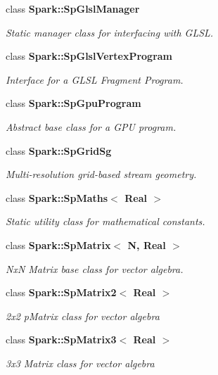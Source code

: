 \begin{CompactItemize}
class {\bf Spark::Sp\-Glsl\-Manager}
\begin{CompactList}\small\item\em Static manager class for interfacing with GLSL. \item\end{CompactList}\item 
class {\bf Spark::Sp\-Glsl\-Vertex\-Program}
\begin{CompactList}\small\item\em Interface for a GLSL Fragment Program. \item\end{CompactList}\item 
class {\bf Spark::Sp\-Gpu\-Program}
\begin{CompactList}\small\item\em Abstract base class for a GPU program. \item\end{CompactList}\item 
class {\bf Spark::Sp\-Grid\-Sg}
\begin{CompactList}\small\item\em Multi-resolution grid-based stream geometry. \item\end{CompactList}\item 
class {\bf Spark::Sp\-Maths$<$ Real $>$}
\begin{CompactList}\small\item\em Static utility class for mathematical constants. \item\end{CompactList}\item 
class {\bf Spark::Sp\-Matrix$<$ N, Real $>$}
\begin{CompactList}\small\item\em Nx\-N Matrix base class for vector algebra. \item\end{CompactList}\item 
class {\bf Spark::Sp\-Matrix2$<$ Real $>$}
\begin{CompactList}\small\item\em 2x2 p\-Matrix class for vector algebra \item\end{CompactList}\item 
class {\bf Spark::Sp\-Matrix3$<$ Real $>$}
\begin{CompactList}\small\item\em 3x3 Matrix class for vector algebra \item\end{CompactList}\item 

\end{CompactItemize}
